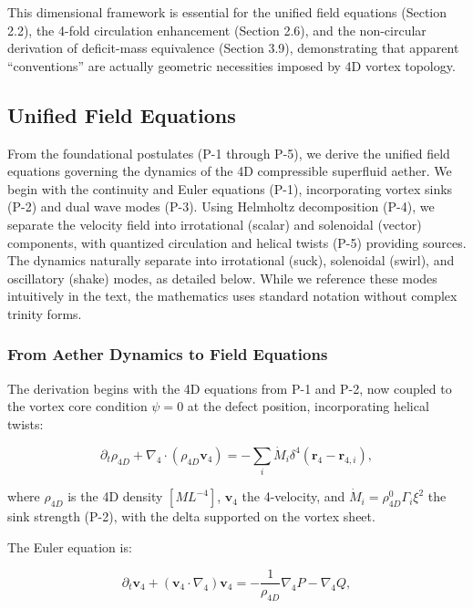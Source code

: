 This dimensional framework is essential for the unified field equations (Section 2.2), the 4-fold circulation enhancement (Section 2.6), and the non-circular derivation of deficit-mass equivalence (Section 3.9), demonstrating that apparent ``conventions'' are actually geometric necessities imposed by 4D vortex topology.

\subsection{Unified Field Equations}

From the foundational postulates (P-1 through P-5), we derive the unified field equations governing the dynamics of the 4D compressible superfluid aether. We begin with the continuity and Euler equations (P-1), incorporating vortex sinks (P-2) and dual wave modes (P-3). Using Helmholtz decomposition (P-4), we separate the velocity field into irrotational (scalar) and solenoidal (vector) components, with quantized circulation and helical twists (P-5) providing sources. The dynamics naturally separate into irrotational (suck), solenoidal (swirl), and oscillatory (shake) modes, as detailed below. While we reference these modes intuitively in the text, the mathematics uses standard notation without complex trinity forms.

\subsubsection{From Aether Dynamics to Field Equations}

The derivation begins with the 4D equations from P-1 and P-2, now coupled to the vortex core condition $\psi=0$ at the defect position, incorporating helical twists:

\begin{equation}
\partial_t \rho_{4D} + \nabla_4 \cdot (\rho_{4D} \mathbf{v}_4) = -\sum_i \dot{M}_i \delta^4(\mathbf{r}_4 - \mathbf{r}_{4,i}),
\end{equation}

where $\rho_{4D}$ is the 4D density $[M L^{-4}]$, $\mathbf{v}_4$ the 4-velocity, and $\dot{M}_i = \rho_{4D}^0 \Gamma_i \xi^2$ the sink strength (P-2), with the delta supported on the vortex sheet.

The Euler equation is:

\begin{equation}
\partial_t \mathbf{v}_4 + (\mathbf{v}_4 \cdot \nabla_4) \mathbf{v}_4 = -\frac{1}{\rho_{4D}} \nabla_4 P - \nabla_4 Q,
\end{equation}


